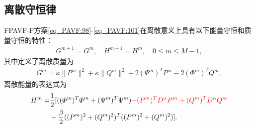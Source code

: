\subsection{离散守恒律}
\begin{theorem}\label{thm_PAVF:4}
FPAVF-P方案\eqref{eq_PAVF:98}-\eqref{eq_PAVF:101}在离散意义上具有以下能量守恒和质量守恒的特性：
\begin{align}\label{eq_PAVF:11141}
G^{m+1}=G^{m}, \quad H^{m+1}=H^{m}, \quad 0 \leq m \leq M-1,
\end{align}
其中定义了离散质量为
\begin{align}\label{eq_PAVF:11142}
G^{m}=\kappa\|P^{m}\|^2+\kappa\|Q^{m}\|^2+2 \left(\Psi^{m}\right)^T P^{m}-2 \left(\varPhi^{m}\right)^T Q^{m},
\end{align}
离散能量的表达式为
\begin{align}
H^{m}=&\frac{1}{2}[((\varPhi^{m})^{T}\varPhi^{m}+(\Psi^{m})^{T}\Psi^{m})\textcolor[rgb]{1.00,0.00,0.00}{+(P^{m})^{T} D^{\alpha} P^{m}+(Q^{m})^{T} D^{\alpha} Q^{m}}\nonumber\\
&+\frac{\beta}{2}((P^{m})^2+(Q^{m})^2)^{T}((P^{m})^2+(Q^{m})^2)].\label{eq_PAVF:800}
\end{align}
\end{theorem}

